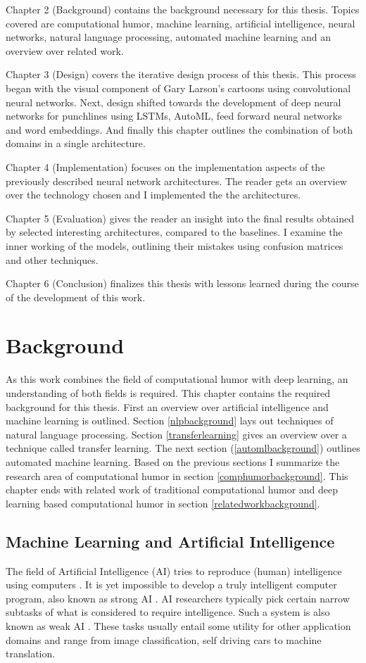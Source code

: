 \documentclass[draft,final,oneside]{vutinfth} %
\begin{document}
Chapter 2 (Background) contains the background necessary for this thesis. Topics covered are computational humor, machine learning, artificial intelligence, neural networks, natural language processing, automated machine learning and an overview over related work.

Chapter 3 (Design) covers the iterative design process of this thesis. This process began with the visual component of Gary Larson's cartoons using convolutional neural networks. Next, design shifted towards the development of deep neural networks for punchlines using LSTMs, AutoML, feed forward neural networks and word embeddings. And finally this chapter outlines the combination of both domains in a single architecture.

Chapter 4 (Implementation) focuses on the implementation aspects of the previously described neural network architectures. The reader gets an overview over the technology chosen and I implemented the the architectures.

Chapter 5 (Evaluation) gives the reader an insight into the final results obtained by selected interesting architectures, compared to the baselines. I examine the inner working of the models, outlining their mistakes using confusion matrices and other techniques.

Chapter 6 (Conclusion) finalizes this thesis with lessons learned during the course of the development of this work. 


\chapter{Background}

As this work combines the field of computational humor with deep learning, an understanding of both fields is required. This chapter contains the required background for this thesis. First an overview over artificial intelligence and machine learning is outlined. Section \ref{nlpbackground} lays out techniques of natural language processing. Section \ref{transferlearning} gives an overview over a technique called transfer learning. The next section (\ref{automlbackground}) outlines automated machine learning. Based on the previous sections I summarize the research area of computational humor in section \ref{comphumorbackground}. This chapter ends with related work of traditional computational humor and deep learning based computational humor in section \ref{relatedworkbackground}.

\section{Machine Learning and Artificial Intelligence}
The field of Artificial Intelligence (AI) tries to reproduce (human) intelligence using computers \cite{questforai}. It is yet impossible to develop a truly intelligent computer program, also known as strong AI \cite{strongweakai}. AI researchers typically pick certain narrow subtasks of what is considered to require intelligence. Such a system is also known as weak AI \cite{strongweakai}. These tasks usually entail some utility for other application domains and range from image classification, self driving cars to machine translation.
\end{document}
